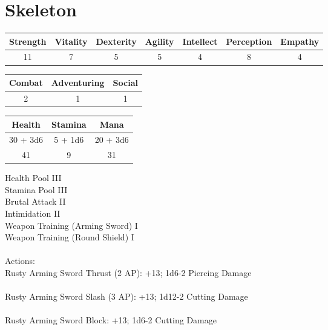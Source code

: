 \section{Skeleton}
\begin{minipage}[H]{1\textwidth}
    \centering
    \begin{tabular}[c]{|c | c | c | c | c | c | c|}
        \hline
        Strength & Vitality & Dexterity & Agility & Intellect & Perception & Empathy\\
        \hline
        11 & 7 & 5 & 5 & 4 & 8 & 4\\
        \hline
    \end{tabular}
\end{minipage}
\begin{minipage}[H]{1\textwidth}
    \centering
    \begin{tabular}[c]{|c | c | c|}
        \hline
        Combat & Adventuring & Social\\
        \hline
        2 & 1 & 1\\
        \hline
    \end{tabular}
\end{minipage}
\begin{minipage}[H]{1\textwidth}
    \centering
    \begin{tabular}[c]{|c | c | c|}
        \hline
        Health & Stamina & Mana\\
        \hline
        30 + 3d6 & 5 + 1d6 & 20 + 3d6\\
        41 & 9 & 31\\
        \hline
    \end{tabular}
\end{minipage}
Health Pool III\\
Stamina Pool III\\
Brutal Attack II\\
Intimidation II\\
Weapon Training (Arming Sword) I\\
Weapon Training (Round Shield) I\\
\\
Actions:\\
Rusty Arming Sword Thrust (2 AP): +13; 1d6-2 Piercing Damage\\
\\
Rusty Arming Sword Slash (3 AP): +13; 1d12-2 Cutting Damage\\
\\
Rusty Arming Sword Block: +13; 1d6-2 Cutting Damage\\
